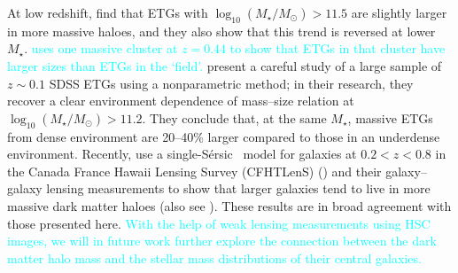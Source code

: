 \documentclass[a4paper,fleqn,usenatbib]{mnras}
\def\ser{{S\'{e}rsic\ }}
\def\mstar{{$M_{\star}$}}
\def\logms{{$\log_{10} (M_{\star}/M_{\odot})$}}
\newcommand{\song}[1]{\textcolor{cyan}{#1}}
\begin{document}
    At low redshift, \citet{Cerbrian2014} find that ETGs with \logms{}$>11.5$ are 
    slightly larger in more massive haloes, and they also show that this trend is 
    reversed at lower \mstar{}. 
    \song{
    \citet{Kuchner2017} uses one massive cluster at $z=0.44$ to show that ETGs in 
    that cluster have larger sizes than ETGs in the `field'. 
    }
    \citet{Yoon2017} present a careful study of a large sample of $z\sim0.1$ SDSS 
    ETGs using a nonparametric method; in their research, they recover a clear 
    environment dependence of mass--size relation at \logms{}$>11.2$. 
    They conclude that, at the same \mstar{}, massive ETGs from dense environment 
    are 20--40\% larger compared to those in an underdense environment.
    Recently, \citet{Charlton2017} use a single-\ser{} model for galaxies at 
    $0.2 < z < 0.8$ in the Canada France Hawaii Lensing Survey (CFHTLenS) 
    (\citealt{Heymans2012}) and their galaxy--galaxy 
    lensing measurements to show that larger galaxies tend to live in more massive 
    dark matter haloes (also see \citealt{Sonnenfeld2017}).
    These results are in broad agreement with those presented here.
    \song{
    With the help of weak lensing measurements using HSC images, we will in future 
    work further explore the connection between the dark matter halo mass and the 
    stellar mass distributions of their central galaxies. 
    }
    
\end{document}
